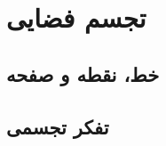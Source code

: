 \documentclass[12pt, a4paper]{book}
\begin{document}
\chapter{تجسم فضایی}

\section{خط، نقطه و صفحه}

\section{تفکر تجسمی}
	
\end{document}
